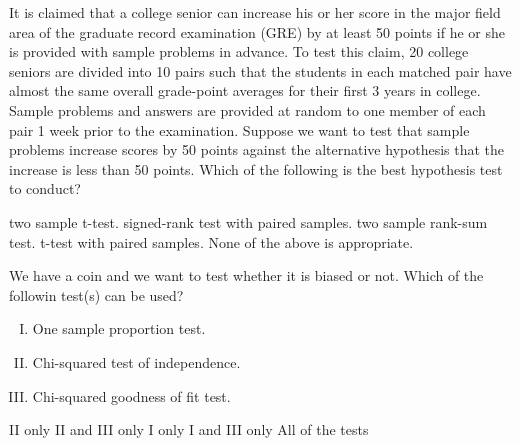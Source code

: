 \documentclass[letterpaper,10pt,addpoints]{exam}
\begin{document}
\begin{questions}
\question It is claimed that a college senior can increase his or her score in the major field area of the graduate record examination (GRE) by at least 50 points if he or she is provided with sample problems in advance. To test this claim, 20 college seniors are divided into 10 pairs such that the students in each matched pair have almost the same overall grade-point averages for their first 3 years in college. Sample problems and answers are provided at random to one member of each pair 1 week prior to the examination. Suppose we want to test that sample problems increase scores by 50 points against the alternative hypothesis that the increase is less than 50 points. Which of the following is the best hypothesis test to conduct?
\begin{choices}
  \choice two sample t-test.
  \correctchoice signed-rank test with paired samples.
  \choice two sample rank-sum test.
  \choice t-test with paired samples.
  \choice None of the above is appropriate.
\end{choices}

\question We have a coin and we want to test whether it is biased or not. Which of the followin test(s) can be used?
\begin{enumerate}[I.]
  \item One sample proportion test.
  \item Chi-squared test of independence.
  \item Chi-squared goodness of fit test.
\end{enumerate}
\begin{choices}
  \choice II only
  \choice II and III only
  \choice I only
  \correctchoice I and III only
  \choice All of the tests
\end{choices}


\end{questions}
\end{document}
